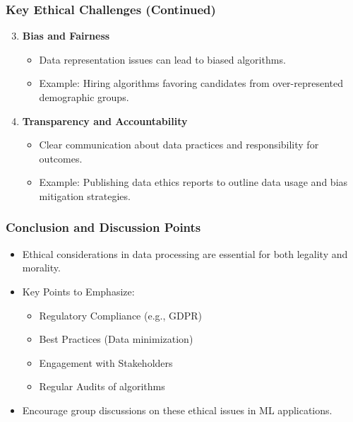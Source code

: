 \documentclass[aspectratio=169]{beamer}
\begin{document}
\begin{frame}[fragile]
    \frametitle{Key Ethical Challenges (Continued)}
    \begin{enumerate}
        \setcounter{enumi}{2} %
        \item \textbf{Bias and Fairness}
            \begin{itemize}
                \item Data representation issues can lead to biased algorithms.
                \item Example: Hiring algorithms favoring candidates from over-represented demographic groups.
            \end{itemize}
        \item \textbf{Transparency and Accountability}
            \begin{itemize}
                \item Clear communication about data practices and responsibility for outcomes.
                \item Example: Publishing data ethics reports to outline data usage and bias mitigation strategies.
            \end{itemize}
    \end{enumerate}
\end{frame}

\begin{frame}[fragile]
    \frametitle{Conclusion and Discussion Points}
    \begin{itemize}
        \item Ethical considerations in data processing are essential for both legality and morality.
        \item Key Points to Emphasize:
            \begin{itemize}
                \item Regulatory Compliance (e.g., GDPR)
                \item Best Practices (Data minimization)
                \item Engagement with Stakeholders
                \item Regular Audits of algorithms
            \end{itemize}
        \item Encourage group discussions on these ethical issues in ML applications.
    \end{itemize}
\end{frame}
\end{document}
